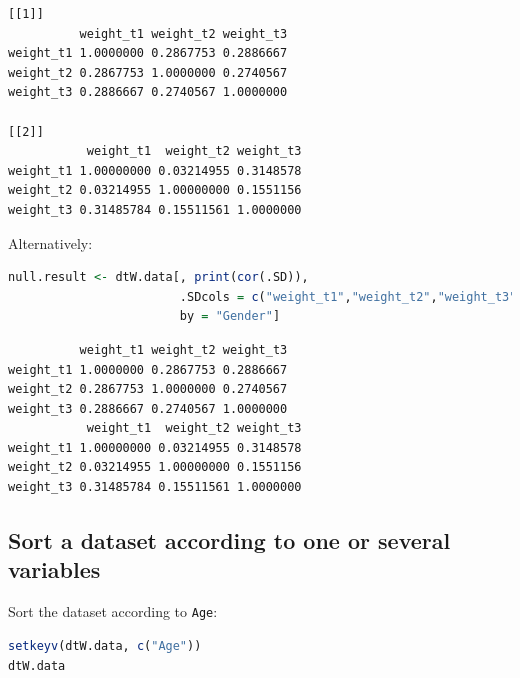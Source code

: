 \documentclass{article}
\begin{document}
\label{}
\begin{verbatim}
[[1]]
          weight_t1 weight_t2 weight_t3
weight_t1 1.0000000 0.2867753 0.2886667
weight_t2 0.2867753 1.0000000 0.2740567
weight_t3 0.2886667 0.2740567 1.0000000

[[2]]
           weight_t1  weight_t2 weight_t3
weight_t1 1.00000000 0.03214955 0.3148578
weight_t2 0.03214955 1.00000000 0.1551156
weight_t3 0.31485784 0.15511561 1.0000000
\end{verbatim}

Alternatively:
\begin{lstlisting}[language=r,numbers=none]
null.result <- dtW.data[, print(cor(.SD)), 
                        .SDcols = c("weight_t1","weight_t2","weight_t3"), 
                        by = "Gender"]
\end{lstlisting}

\label{}
\begin{verbatim}
          weight_t1 weight_t2 weight_t3
weight_t1 1.0000000 0.2867753 0.2886667
weight_t2 0.2867753 1.0000000 0.2740567
weight_t3 0.2886667 0.2740567 1.0000000
           weight_t1  weight_t2 weight_t3
weight_t1 1.00000000 0.03214955 0.3148578
weight_t2 0.03214955 1.00000000 0.1551156
weight_t3 0.31485784 0.15511561 1.0000000
\end{verbatim}
\subsection{Sort a dataset according to one or several variables}
\label{sec:orga57a53d}

Sort the dataset according to \texttt{Age}:
\begin{lstlisting}[language=r,numbers=none]
setkeyv(dtW.data, c("Age"))
dtW.data
\end{lstlisting}
\end{document}
